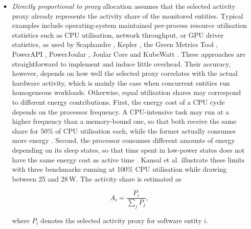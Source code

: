 \documentclass[
  acmsmall,
  screen,
  review,
  xcolor={dvipsnames,usenames}
]{acmart}
\begin{document}
\begin{itemize}

    \item \emph{Directly proportional to proxy} allocation assumes that the selected activity proxy already represents the activity share of the monitored entities. Typical examples include operating-system maintained per-process resource utilisation statistics such as CPU utilisation, network throughput, or GPU driver statistics, as used by Scaphandre \cite{centofantiImpactPowerConsumption2024,Scaphandre}, Kepler \cite{amaralKeplerFrameworkCalculate2023,SustainablecomputingioKepler2026}, the Green Metrics Tool \cite{hoffmannGreenMetricsTool2025}, PowerAPI \cite{noureddineMonitoringEnergyHotspots2015}, PowerJoular \cite{noureddinePowerJoularJoularJXMultiPlatform2022}, Joular Core \cite{noureddineJoularCoreUniversal2026,JoularJoularcore2026} and KubeWatt \cite{pijnackerContainerlevelEnergyObservability2025}. These approaches are straightforward to implement and induce little overhead. Their accuracy, however, depends on how well the selected proxy correlates with the actual hardware activity, which is mainly the case when concurrent entities run homogeneous workloads. Otherwise, equal utilisation shares may correspond to different energy contributions. First, the energy cost of a CPU cycle depends on the processor frequency. A CPU-intensive task may run at a higher frequency than a memory-bound one, so that both receive the same share for 50\% of CPU utilisation each, while the former actually consumes more energy \cite{noureddineMonitoringEnergyHotspots2015,pahlkeUnlockEnergyConsumption2024}. Second, the processor consumes different amounts of energy depending on its sleep states, so that time spent in low-power states does not have the same energy cost as active time \cite{kansalVirtualMachinePower2010,pahlkeUnlockEnergyConsumption2024}. Kansal et al. \cite{kansalVirtualMachinePower2010} illustrate these limits with three benchmarks running at 100\% CPU utilisation while drawing between 25 and 28\,W. The activity share is estimated as

    \begin{equation}
    A_i=\frac{P_i}{\sum_j P_j},
    \end{equation}

    where $P_i$ denotes the selected activity proxy for software entity $i$.


\end{itemize}
\end{document}
